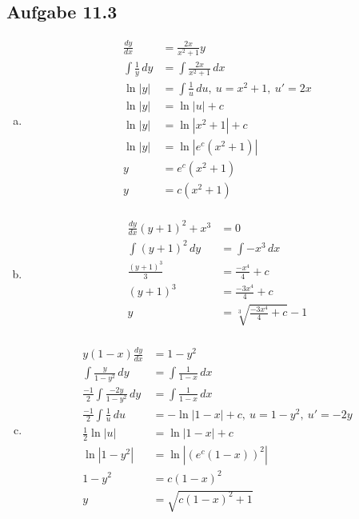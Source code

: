 \documentclass{standalone}
\begin{document}
\subsection{Aufgabe 11.3}
\begin{enumerate}[a)]
\item
    \begin{align*}
        \frac{dy}{dx} &= \frac{2x}{x^2+1}y \\
        \int \frac{1}{y} \,dy &= \int \frac{2x}{x^2+1} \,dx \\
        \ln|y| &= \int \frac{1}{u} \,du,\ u = x^2+1,\ u' = 2x \\
        \ln|y| &= \ln|u| + c \\
        \ln|y| &= \ln|x^2+1| + c \\
        \ln|y| &= \ln|e^c(x^2+1)| \\
        y &= e^c(x^2+1) \\
        y &= c(x^2+1) \\
    \end{align*}

\item
    \begin{align*}
        \frac{dy}{dx} (y + 1)^2 + x^3 &= 0 \\
        \int (y + 1)^2 \,dy &= \int -x^3 \,dx \\
        \frac{(y + 1)^3}{3} &= \frac{-x^4}{4} + c \\
        (y + 1)^3 &= \frac{-3x^4}{4} + c \\
        y &= \sqrt[3]{\frac{-3x^4}{4} + c} - 1 \\
    \end{align*}

\item
    \begin{align*}
        y(1-x) \frac{dy}{dx} &= 1-y^2 \\
        \int \frac{y}{1-y^2} \,dy &= \int \frac{1}{1-x} \,dx \\
        \frac{-1}{2} \int \frac{-2y}{1-y^2} \,dy &= \int \frac{1}{1-x} \,dx \\
        \frac{-1}{2} \int \frac{1}{u} \,du &= -\ln|1-x| + c,\ u = 1-y^2,\ u' = -2y \\
        \frac{1}{2} \ln|u| &= \ln|1-x| + c \\
        \ln|1-y^2| &= \ln|(e^c(1-x))^2| \\
        1-y^2 &= c(1-x)^2 \\
        y &= \sqrt{c(1-x)^2 + 1} \\
    \end{align*}

\end{enumerate}
\end{document}
